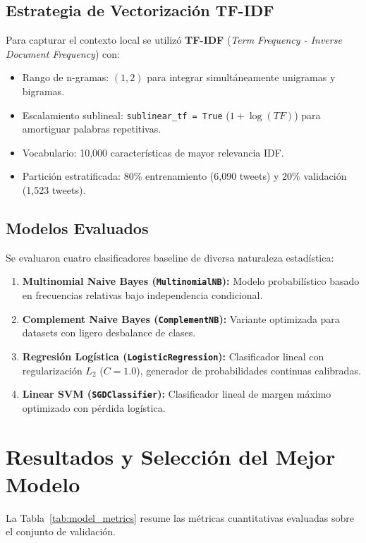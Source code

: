 \documentclass[11pt,a4paper]{article}
\begin{document}
\subsection{Estrategia de Vectorización TF-IDF}
Para capturar el contexto local se utilizó \textbf{TF-IDF} (\textit{Term Frequency - Inverse Document Frequency}) con:
\begin{itemize}
    \item Rango de n-gramas: $(1, 2)$ para integrar simultáneamente unigramas y bigramas.
    \item Escalamiento sublineal: \texttt{sublinear\_tf = True} ($1 + \log(TF)$) para amortiguar palabras repetitivas.
    \item Vocabulario: 10,000 características de mayor relevancia IDF.
    \item Partición estratificada: 80\% entrenamiento (6,090 tweets) y 20\% validación (1,523 tweets).
\end{itemize}

\subsection{Modelos Evaluados}
Se evaluaron cuatro clasificadores baseline de diversa naturaleza estadística:
\begin{enumerate}
    \item \textbf{Multinomial Naive Bayes (\texttt{MultinomialNB}):} Modelo probabilístico basado en frecuencias relativas bajo independencia condicional.
    \item \textbf{Complement Naive Bayes (\texttt{ComplementNB}):} Variante optimizada para datasets con ligero desbalance de clases.
    \item \textbf{Regresión Logística (\texttt{LogisticRegression}):} Clasificador lineal con regularización $L_2$ ($C=1.0$), generador de probabilidades continuas calibradas.
    \item \textbf{Linear SVM (\texttt{SGDClassifier}):} Clasificador lineal de margen máximo optimizado con pérdida logística.
\end{enumerate}

\section{Resultados y Selección del Mejor Modelo}
La Tabla~\ref{tab:model_metrics} resume las métricas cuantitativas evaluadas sobre el conjunto de validación.
\end{document}
